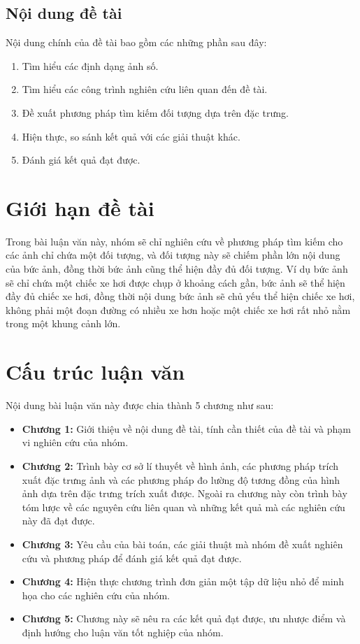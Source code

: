 \documentclass[a4paper,14pt]{extreport}
\begin{document}
\subsection{Nội dung đề tài}
Nội dung chính của đề tài bao gồm các những phần sau đây:
\begin{enumerate}
    \item Tìm hiểu các định dạng ảnh số.
    \item Tìm hiểu các công trình nghiên cứu liên quan đến đề tài.
    \item Đề xuất phương pháp tìm kiếm đối tượng dựa trên đặc trưng.
    \item Hiện thực, so sánh kết quả với các giải thuật khác.
    \item Đánh giá kết quả đạt được.
\end{enumerate}

\section{Giới hạn đề tài}
 Trong bài luận văn này, nhóm sẽ chỉ nghiên cứu về phương pháp tìm kiếm cho các ảnh chỉ chứa một đối tượng, và đối tượng này sẽ chiếm phần lớn nội dung của bức ảnh, 
đồng thời bức ảnh cũng thể hiện đầy đủ đối tượng. Ví dụ bức ảnh sẽ chỉ chứa một chiếc xe hơi được chụp ở khoảng cách gần, bức ảnh sẽ thể hiện đầy đủ chiếc xe hơi, 
đồng thời nội dung bức ảnh sẽ chủ yếu thể hiện chiếc xe hơi, không phải một đoạn đường có nhiều xe hơn hoặc một chiếc xe hơi rất nhỏ nằm trong một khung cảnh lớn.

\section{Cấu trúc luận văn}
Nội dung bài luận văn này được chia thành 5 chương như sau:
\begin{itemize}
    \item \textbf{Chương 1:} Giới thiệu về nội dung đề tài, tính cần thiết của đề tài và phạm vi nghiên cứu của nhóm.
    \item \textbf{Chương 2:} Trình bày cơ sở lí thuyết về hình ảnh, các phương pháp trích xuất đặc trưng ảnh và các phương pháp đo lường độ tương đồng của hình ảnh dựa trên đặc trưng trích xuất được. Ngoài ra chương này còn trình bày tóm lược về các nguyên cứu liên quan và những kết quả  mà các nghiên cứu này đã đạt được.
    \item \textbf{Chương 3:} Yêu cầu của bài toán, các giải thuật mà nhóm đề xuất nghiên cứu và phương pháp để đánh giá kết quả đạt được.
    \item \textbf{Chương 4:} Hiện thực chương trình đơn giản một tập dữ liệu nhỏ để minh họa cho các nghiên cứu của nhóm.
    \item \textbf{Chương 5:} Chương này sẽ nêu ra các kết quả đạt được, ưu nhược điểm và định hướng cho luận văn tốt nghiệp của nhóm.
\end{itemize}
\end{document}
